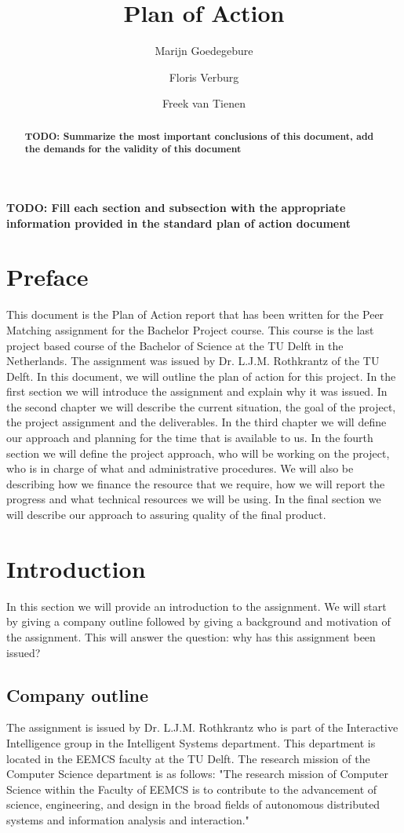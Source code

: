 \documentclass[]{article}
\title{Plan of Action}
\author{Marijn Goedegebure \and
	Floris Verburg \and
	Freek van Tienen}
\date{}
\newcommand{\TODO}[1]{{\color{red}\textbf{TODO: #1}}}
\begin{document}
\maketitle

\begin{abstract}
\TODO{Summarize the most important conclusions of this document, add the demands for the validity of this document}
\end{abstract}

\newpage

\tableofcontents

\newpage
\TODO{Fill each section and subsection with the appropriate information provided in the standard plan of action document}
\section{Preface}
This document is the Plan of Action report that has been written for the Peer Matching assignment for the Bachelor Project course.
This course is the last project based course of the Bachelor of Science at the TU Delft in the Netherlands.
The assignment was issued by Dr. L.J.M. Rothkrantz of the TU Delft.
In this document, we will outline the plan of action for this project.
In the first section we will introduce the assignment and explain why it was issued.
In the second chapter we will describe the current situation, the goal of the project, the project assignment and the deliverables.
In the third chapter we will define our approach and planning for the time that is available to us.
In the fourth section we will define the project approach, who will be working on the project, who is in charge of what and administrative procedures.
We will also be describing how we finance the  resource that we require, how we will report the progress and what technical resources we will be using.
In the final section we will describe our approach to assuring quality of the final product.
\section{Introduction}
In this section we will provide an introduction to the assignment.
We will start by giving a company outline followed by giving a background and motivation of the assignment.
This will answer the question: why has this assignment been issued? 
\subsection{Company outline}
The assignment is issued by Dr. L.J.M. Rothkrantz who is part of the Interactive Intelligence group in the Intelligent Systems department.
This department is located in the EEMCS faculty at the TU Delft.
The research mission of the Computer Science department is as follows:
"The research mission of Computer Science within the Faculty of EEMCS is to contribute to the advancement of science, engineering, and design in the broad fields of autonomous distributed systems and information analysis and interaction."\cite{cstudelftnl}
\end{document}
